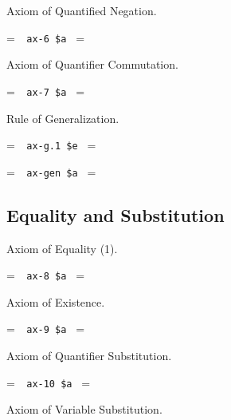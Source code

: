 \noindent Axiom of Quantified Negation.

\setbox\startprefix=\hbox{\tt \ \ ax-6\ \$a\ }
\setbox\contprefix=\hbox{\tt \ \ \ \ \ \ \ \ \ \ }
\startm
\m{\vdash}\m{(}\m{\lnot}\m{\forall}\m{\lnot}\m{\forall}\m{\varphi}\m{
\rightarrow}\m{\varphi}\m{)}
\endm

\noindent Axiom of Quantifier Commutation.

\setbox\startprefix=\hbox{\tt \ \ ax-7\ \$a\ }
\setbox\contprefix=\hbox{\tt \ \ \ \ \ \ \ \ \ \ }
\startm
\m{\vdash}\m{(}\m{\forall}\m{\forall}\m{\varphi}\m{\rightarrow}\m{
\forall}\m{\forall}\m{\varphi}\m{)}
\endm


\noindent Rule of Generalization.

\setbox\startprefix=\hbox{\tt \ \ ax-g.1\ \$e\ }
\setbox\contprefix=\hbox{\tt \ \ \ \ \ \ \ \ \ \ \ \ }
\startm
\m{\vdash}\m{\varphi}
\endm

\setbox\startprefix=\hbox{\tt \ \ ax-gen\ \$a\ }
\setbox\contprefix=\hbox{\tt \ \ \ \ \ \ \ \ \ \ \ \ }
\startm
\m{\vdash}\m{\forall}\m{\varphi}
\endm


\subsection{Equality and Substitution}

\noindent Axiom of Equality (1).

\setbox\startprefix=\hbox{\tt \ \ ax-8\ \$a\ }
\setbox\contprefix=\hbox{\tt \ \ \ \ \ \ \ \ \ \ }
\startm
\m{\vdash}\m{(}\m{=}\m{\rightarrow}\m{(}\m{=}\m{
\rightarrow}\m{=}\m{)}\m{)}
\endm

\noindent Axiom of Existence.

\setbox\startprefix=\hbox{\tt \ \ ax-9\ \$a\ }
\setbox\contprefix=\hbox{\tt \ \ \ \ \ \ \ \ \ \ }
\startm
\m{\vdash}\m{(}\m{\forall}\m{(}\m{=}\m{\rightarrow}\m{\forall}
\m{\varphi}\m{)}\m{\rightarrow}\m{\varphi}\m{)}
\endm

\noindent Axiom of Quantifier Substitution.

\setbox\startprefix=\hbox{\tt \ \ ax-10\ \$a\ }
\setbox\contprefix=\hbox{\tt \ \ \ \ \ \ \ \ \ \ \ }
\startm
\m{\vdash}\m{(}\m{\forall}\m{=}\m{\rightarrow}\m{(}\m{\forall}
\m{\varphi}\m{\rightarrow}\m{\forall}\m{\varphi}\m{)}\m{)}
\endm


\noindent Axiom of Variable Substitution.

